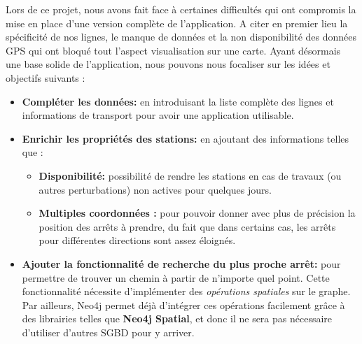 Lors de ce projet, nous avons fait face à certaines difficultés qui ont compromis la mise en place d'une version complète de l'application. A citer en premier lieu la spécificité de nos lignes, le manque de données et la non disponibilité des données GPS qui ont bloqué tout l'aspect visualisation sur une carte.\newline\newline
Ayant désormais une base solide de l'application, nous pouvons nous focaliser sur les idées et objectifs suivants :
\begin{itemize}
	\item \textbf{Compléter les données:} en introduisant la liste complète des lignes et informations de transport pour avoir une application utilisable.
	
	\item \textbf{Enrichir les propriétés des stations: }en ajoutant des informations telles que :
		\begin{itemize}
			\item \textbf{Disponibilité:} possibilité de rendre les stations en cas de travaux (ou autres perturbations) non actives pour quelques jours.
			\item \textbf{Multiples coordonnées :} pour pouvoir donner avec plus de précision la position des arrêts à prendre, du fait que dans certains cas, les arrêts pour différentes directions sont assez éloignés.
		\end{itemize}
		
	\item \textbf{Ajouter la fonctionnalité de recherche du plus proche arrêt: } pour permettre de trouver un chemin à partir de n'importe quel point. Cette fonctionnalité nécessite d'implémenter des \emph{opérations spatiales} sur le graphe. Par ailleurs, Neo4j permet déjà d'intégrer ces opérations facilement grâce à des \glspl{librairie} telles que \textbf{Neo4j Spatial}, et donc il ne sera pas nécessaire d'utiliser d'autres SGBD pour y arriver.


\end{itemize}

